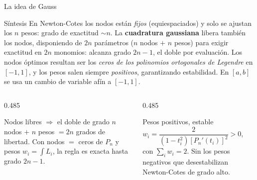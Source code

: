 \documentclass[aspectratio=169,10pt]{beamer}
\begin{document}
\begin{frame}{La idea de Gauss}
\begin{cardidea}{Síntesis}{\faLightbulb}
En Newton-Cotes los nodos están \emph{fijos} (equiespaciados) y solo se ajustan los $n$ pesos: grado de exactitud $\sim n$. La \textbf{cuadratura gaussiana} libera también los nodos, disponiendo de $2n$ parámetros ($n$ nodos $+$ $n$ pesos) para exigir exactitud en $2n$ monomios: alcanza grado \textbf{$2n-1$}, el doble por evaluación. Los nodos óptimos resultan ser los \emph{ceros de los polinomios ortogonales de Legendre} en $[-1,1]$, y los pesos salen siempre \emph{positivos}, garantizando estabilidad. En $[a,b]$ se usa un cambio de variable afín a $[-1,1]$.
\end{cardidea}
\vspace{2mm}
\begin{columns}[T]
\begin{column}{0.485\textwidth}
\begin{cardgear}{Nodos libres $\Rightarrow$ el doble de grado}{\faCogs}
$n$ nodos $+$ $n$ pesos $=2n$ grados de libertad. Con nodos $=$ ceros de $P_n$ y pesos $w_i=\int L_i$, la regla es exacta hasta grado $2n-1$.
\end{cardgear}
\end{column}
\begin{column}{0.485\textwidth}
\begin{cardgear}{Pesos positivos, estable}{\faCogs}
$w_i=\dfrac{2}{(1-t_i^2)[P_n'(t_i)]^2}>0$, con $\sum_i w_i=2$. Sin los pesos negativos que desestabilizan Newton-Cotes de grado alto.
\end{cardgear}
\end{column}
\end{columns}
\end{frame}
\end{document}
